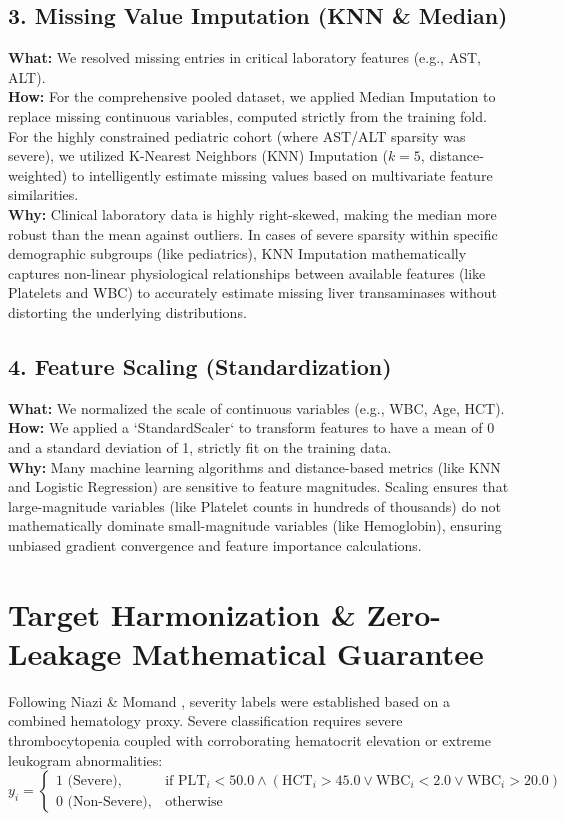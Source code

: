 \documentclass[12pt, a4paper]{report}
\begin{document}
\subsection{3. Missing Value Imputation (KNN \& Median)}
\textbf{What:} We resolved missing entries in critical laboratory features (e.g., AST, ALT). \\
\textbf{How:} For the comprehensive pooled dataset, we applied Median Imputation to replace missing continuous variables, computed strictly from the training fold. For the highly constrained pediatric cohort (where AST/ALT sparsity was severe), we utilized K-Nearest Neighbors (KNN) Imputation ($k=5$, distance-weighted) to intelligently estimate missing values based on multivariate feature similarities. \\
\textbf{Why:} Clinical laboratory data is highly right-skewed, making the median more robust than the mean against outliers. In cases of severe sparsity within specific demographic subgroups (like pediatrics), KNN Imputation mathematically captures non-linear physiological relationships between available features (like Platelets and WBC) to accurately estimate missing liver transaminases without distorting the underlying distributions.

\subsection{4. Feature Scaling (Standardization)}
\textbf{What:} We normalized the scale of continuous variables (e.g., WBC, Age, HCT). \\
\textbf{How:} We applied a `StandardScaler` to transform features to have a mean of 0 and a standard deviation of 1, strictly fit on the training data. \\
\textbf{Why:} Many machine learning algorithms and distance-based metrics (like KNN and Logistic Regression) are sensitive to feature magnitudes. Scaling ensures that large-magnitude variables (like Platelet counts in hundreds of thousands) do not mathematically dominate small-magnitude variables (like Hemoglobin), ensuring unbiased gradient convergence and feature importance calculations.


\section{Target Harmonization \& Zero-Leakage Mathematical Guarantee}
Following Niazi \& Momand \cite{niazi2026}, severity labels were established based on a combined hematology proxy. Severe classification requires severe thrombocytopenia coupled with corroborating hematocrit elevation or extreme leukogram abnormalities:
\begin{equation}
y_i = 
\begin{cases} 
1 \text{ (Severe)}, & \text{if } \text{PLT}_i < 50.0 \land (\text{HCT}_i > 45.0 \lor \text{WBC}_i < 2.0 \lor \text{WBC}_i > 20.0) \\
0 \text{ (Non-Severe)}, & \text{otherwise}
\end{cases}
\end{equation}
\end{document}
